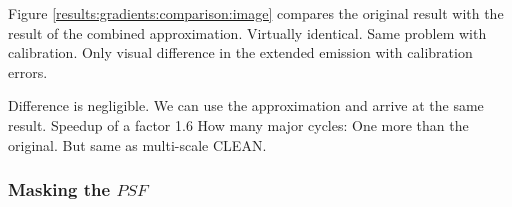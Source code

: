 Figure \ref{results:gradients:comparison:image} compares the original result with the result of the combined approximation. Virtually identical. Same problem with calibration. Only visual difference in the extended emission with calibration errors. 


Difference is negligible. We can use the approximation and arrive at the same result. Speedup of a factor 1.6
How many major cycles: One more than the original. But same as multi-scale CLEAN.

\subsubsection{Masking the $PSF$}
